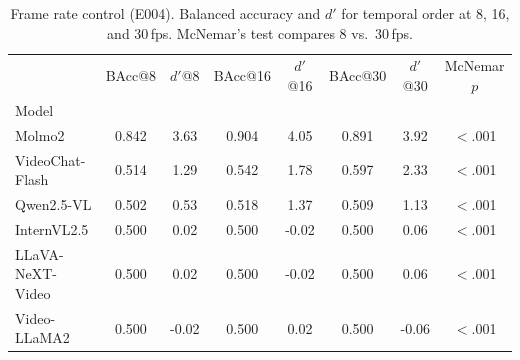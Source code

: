\begin{table}[t]
\centering
\small
\caption{Frame rate control (E004). Balanced accuracy and $d'$ for temporal order at 8, 16, and 30\,fps. McNemar's test compares 8 vs.\ 30\,fps.}
\label{tab:fps}
\begin{tabular}{lccccccc}
\toprule
 & BAcc@8 & $d'$@8 & BAcc@16 & $d'$@16 & BAcc@30 & $d'$@30 & McNemar $p$ \\
Model &  &  &  &  &  &  &  \\
\midrule
Molmo2 & 0.842 & 3.63 & 0.904 & 4.05 & 0.891 & 3.92 & $<$.001 \\
VideoChat-Flash & 0.514 & 1.29 & 0.542 & 1.78 & 0.597 & 2.33 & $<$.001 \\
Qwen2.5-VL & 0.502 & 0.53 & 0.518 & 1.37 & 0.509 & 1.13 & $<$.001 \\
InternVL2.5 & 0.500 & 0.02 & 0.500 & -0.02 & 0.500 & 0.06 & $<$.001 \\
LLaVA-NeXT-Video & 0.500 & 0.02 & 0.500 & -0.02 & 0.500 & 0.06 & $<$.001 \\
Video-LLaMA2 & 0.500 & -0.02 & 0.500 & 0.02 & 0.500 & -0.06 & $<$.001 \\
\bottomrule
\end{tabular}
\end{table}

